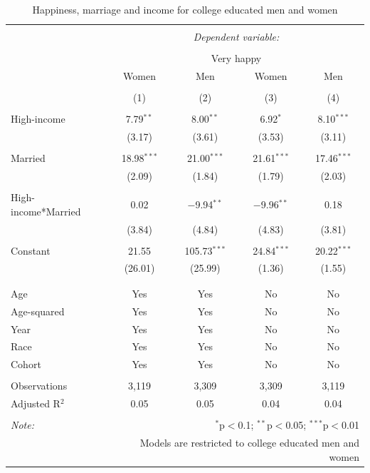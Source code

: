 \documentclass[]{article}
\begin{document}
\begin{table}[!htbp] \centering 
  \caption{Happiness, marriage and income for college educated men and women} 
  \label{} 
\begin{tabular}{@{\extracolsep{5pt}}lcccc} 
\\[-1.8ex]\hline 
\hline \\[-1.8ex] 
 & \multicolumn{4}{c}{\textit{Dependent variable:}} \\ 
\cline{2-5} 
\\[-1.8ex] & \multicolumn{4}{c}{Very happy} \\ 
 & Women & Men & Women & Men \\ 
\\[-1.8ex] & (1) & (2) & (3) & (4)\\ 
\hline \\[-1.8ex] 
 High-income & 7.79$^{**}$ & 8.00$^{**}$ & 6.92$^{*}$ & 8.10$^{***}$ \\ 
  & (3.17) & (3.61) & (3.53) & (3.11) \\ 
  & & & & \\ 
 Married & 18.98$^{***}$ & 21.00$^{***}$ & 21.61$^{***}$ & 17.46$^{***}$ \\ 
  & (2.09) & (1.84) & (1.79) & (2.03) \\ 
  & & & & \\ 
 High-income*Married & 0.02 & $-$9.94$^{**}$ & $-$9.96$^{**}$ & 0.18 \\ 
  & (3.84) & (4.84) & (4.83) & (3.81) \\ 
  & & & & \\ 
 Constant & 21.55 & 105.73$^{***}$ & 24.84$^{***}$ & 20.22$^{***}$ \\ 
  & (26.01) & (25.99) & (1.36) & (1.55) \\ 
  & & & & \\ 
\hline \\[-1.8ex] 
Age & Yes & Yes & No & No \\ 
Age-squared & Yes & Yes & No & No \\ 
Year & Yes & Yes & No & No \\ 
Race & Yes & Yes & No & No \\ 
Cohort & Yes & Yes & No & No \\ 
\hline \\[-1.8ex] 
Observations & 3,119 & 3,309 & 3,309 & 3,119 \\ 
Adjusted R$^{2}$ & 0.05 & 0.05 & 0.04 & 0.04 \\ 
\hline 
\hline \\[-1.8ex] 
\textit{Note:}  & \multicolumn{4}{r}{$^{*}$p$<$0.1; $^{**}$p$<$0.05; $^{***}$p$<$0.01} \\ 
 & \multicolumn{4}{r}{Models are restricted to college educated men and women} \\ 
\end{tabular} 
\end{table}
\end{document}
